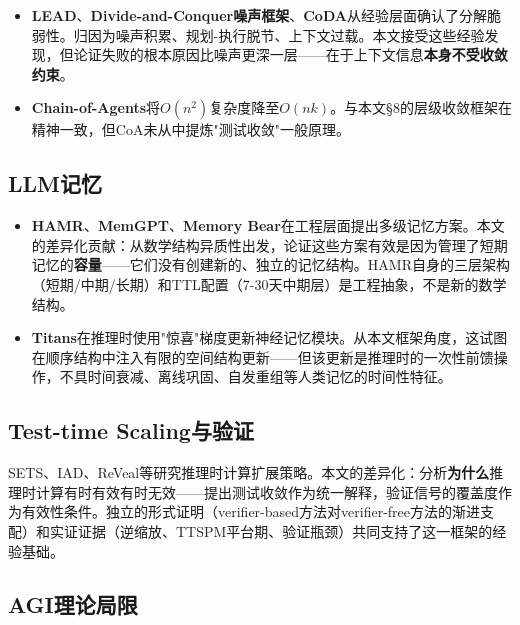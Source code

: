 \documentclass[11pt,a4paper]{ctexart}
\begin{document}
\begin{itemize}[leftmargin=*]
    \item \textbf{LEAD}\cite{LEAD2025}、\textbf{Divide-and-Conquer噪声框架}、\textbf{CoDA}从经验层面确认了分解脆弱性。归因为噪声积累、规划-执行脱节、上下文过载。本文接受这些经验发现，但论证失败的根本原因比噪声更深一层——在于上下文信息\textbf{本身不受收敛约束}。
    \item \textbf{Chain-of-Agents}\cite{ChainOfAgents2024}将$O(n^2)$复杂度降至$O(nk)$。与本文§8的层级收敛框架在精神一致，但CoA未从中提炼"测试收敛"一般原理。
\end{itemize}

\subsection{LLM记忆}

\begin{itemize}[leftmargin=*]
    \item \textbf{HAMR}\cite{HAMR2025}、\textbf{MemGPT}\cite{MemGPT2024}、\textbf{Memory Bear}\cite{MemoryBear2025}在工程层面提出多级记忆方案。本文的差异化贡献：从数学结构异质性出发，论证这些方案有效是因为管理了短期记忆的\textbf{容量}——它们没有创建新的、独立的记忆结构。HAMR自身的三层架构（短期/中期/长期）和TTL配置（7-30天中期层）是工程抽象，不是新的数学结构。
    \item \textbf{Titans}\cite{Titans2025}在推理时使用"惊喜"梯度更新神经记忆模块。从本文框架角度，这试图在顺序结构中注入有限的空间结构更新——但该更新是推理时的一次性前馈操作，不具时间衰减、离线巩固、自发重组等人类记忆的时间性特征。
\end{itemize}

\subsection{Test-time Scaling与验证}

SETS、IAD、ReVeal等研究推理时计算扩展策略。本文的差异化：分析\textbf{为什么}推理时计算有时有效有时无效——提出测试收敛作为统一解释，验证信号的覆盖度作为有效性条件。独立的形式证明\cite{VerifierScaling2025}（verifier-based方法对verifier-free方法的渐进支配）和实证证据\cite{Gema2025Inverse,Wang2025TTSPM,Zhao2025Verification}（逆缩放、TTSPM平台期、验证瓶颈）共同支持了这一框架的经验基础。

\subsection{AGI理论局限}
\end{document}
